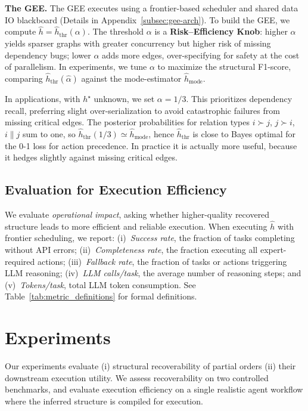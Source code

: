 \documentclass{article}
\theoremstyle{plain}
\theoremstyle{definition}
\theoremstyle{remark}
\begin{document}
\noindent \textbf{The GEE.}
The GEE executes using a frontier-based scheduler and shared data IO blackboard (Details in Appendix~\ref{subsec:gee-arch}). %
To build the GEE, we compute $\widehat h=\hat h_{\text{thr}}(\alpha)$. 
The threshold $\alpha$ is a \textbf{Risk--Efficiency Knob}: higher $\alpha$ yields sparser graphs with greater concurrency but higher risk of missing dependency bugs; lower $\alpha$ adds more edges, over-specifying for safety at the cost of parallelism. In experiments, we tune $\alpha$ to maximize the structural F1-score, comparing $\hat{h}_{\text{thr}}(\hat\alpha)$ against the mode-estimator $\hat{h}_{\text{mode}}$. 

In applications, with $h^\star$ unknown, 
we set $\alpha=1/3$. This prioritizes dependency recall, preferring slight over-serialization to avoid catastrophic failures from missing critical edges. The posterior probabilities for relation types $i \succ j$, $j \succ i$, $i \parallel j$ sum to one, so $\hat{h}_{\text{thr}}(1/3)\simeq \hat{h}_{\text{mode}}$, hence $\hat{h}_{\text{thr}}$ is close to Bayes optimal for the 0-1 loss for action precedence. In practice it is actually more useful, because it hedges slightly against missing critical edges.

\subsection{Evaluation for Execution Efficiency}
We evaluate \emph{operational impact}, asking whether higher-quality recovered structure leads to more efficient and reliable execution.
When executing $\widehat{h}$ with frontier scheduling, we report:
(i)~\emph{Success rate}, the fraction of tasks completing without API errors;
(ii)~\emph{Completeness rate}, the fraction executing all expert-required actions;
(iii)~\emph{Fallback rate}, the fraction of tasks or actions triggering LLM reasoning;
(iv)~\emph{LLM calls/task}, the average number of reasoning steps; and
(v)~\emph{Tokens/task}, total LLM token consumption.
See Table~\ref{tab:metric_definitions} for formal definitions.



\section{Experiments}
\label{sec:experiments}

Our experiments evaluate (i) structural recoverability of partial orders (ii) their downstream execution utility.
We assess recoverability on two controlled benchmarks, and evaluate execution efficiency on a single realistic agent workflow where the inferred structure is compiled for execution.
\end{document}
